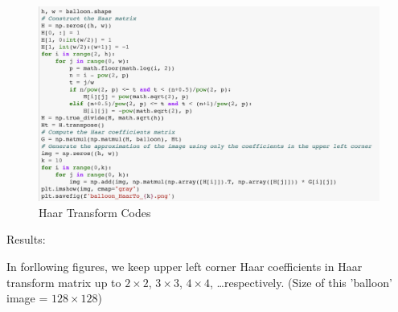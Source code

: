 \documentclass[12pt]{article}
\begin{document}
\begin{figure}[H]
    \centering
    \includegraphics[width=1\textwidth]{haar_code.png}
    \caption{Haar Transform Codes}
\end{figure}
\begin{flushleft}
Results:

In forllowing figures, we keep upper left corner Haar coefficients in Haar transform matrix up to  $2 \times 2$, 
$3 \times 3$, $4 \times 4$, \dots respectively.
(Size of this 'balloon' image = $128 \times 128$)
\end{flushleft}
\end{document}
